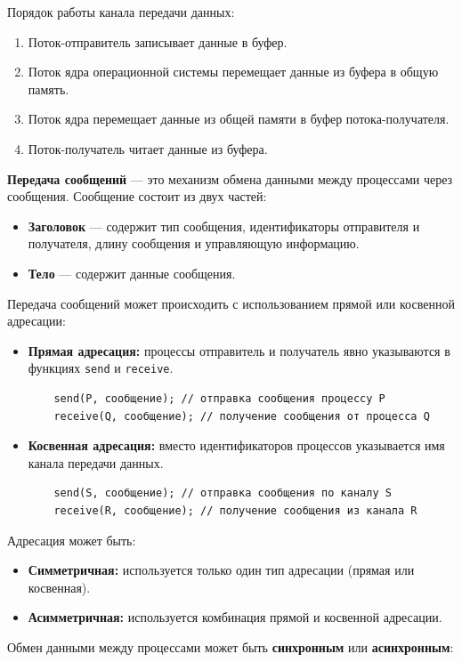 \documentclass[a4paper, 12pt]{report}
\numberwithin{equation}{section}
\begin{document}
Порядок работы канала передачи данных:
\begin{enumerate}
    \item Поток-отправитель записывает данные в буфер.
    \item Поток ядра операционной системы перемещает данные из буфера в общую память.
    \item Поток ядра перемещает данные из общей памяти в буфер потока-получателя.
    \item Поток-получатель читает данные из буфера.
\end{enumerate}
\textbf{Передача сообщений} — это механизм обмена данными между процессами через сообщения. Сообщение состоит из двух частей:
\begin{itemize}
    \item \textbf{Заголовок} — содержит тип сообщения, идентификаторы отправителя и получателя, длину сообщения и управляющую информацию.
    \item \textbf{Тело} — содержит данные сообщения.
\end{itemize}
Передача сообщений может происходить с использованием прямой или косвенной адресации:
\begin{itemize}
    \item \textbf{Прямая адресация:} процессы отправитель и получатель явно указываются в функциях \texttt{send} и \texttt{receive}.
    \begin{verbatim}
    send(P, сообщение); // отправка сообщения процессу P
    receive(Q, сообщение); // получение сообщения от процесса Q
    \end{verbatim}
    \item \textbf{Косвенная адресация:} вместо идентификаторов процессов указывается имя канала передачи данных.
    \begin{verbatim}
    send(S, сообщение); // отправка сообщения по каналу S
    receive(R, сообщение); // получение сообщения из канала R
    \end{verbatim}
\end{itemize}
Адресация может быть:
\begin{itemize}
    \item \textbf{Симметричная:} используется только один тип адресации (прямая или косвенная).
    \item \textbf{Асимметричная:} используется комбинация прямой и косвенной адресации.
\end{itemize}
Обмен данными между процессами может быть \textbf{синхронным} или \textbf{асинхронным}:
\end{document}

